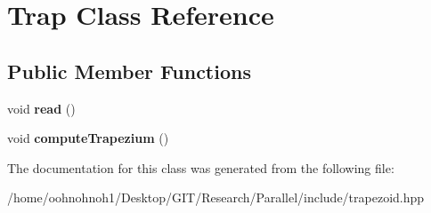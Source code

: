 \hypertarget{classTrap}{}\section{Trap Class Reference}
\label{classTrap}
\subsection*{Public Member Functions}
\begin{DoxyCompactItemize}
\item 
\mbox{\label{classTrap_a510dd45e4b75d05c0af9ce21c1193999}} 
void {\bfseries read} ()
\item 
\mbox{\label{classTrap_af30bd4510371c688027c0a283f16b6e8}} 
void {\bfseries compute\+Trapezium} ()
\end{DoxyCompactItemize}


The documentation for this class was generated from the following file\+:\begin{DoxyCompactItemize}
\item 
/home/oohnohnoh1/\+Desktop/\+G\+I\+T/\+Research/\+Parallel/include/trapezoid.\+hpp\end{DoxyCompactItemize}
